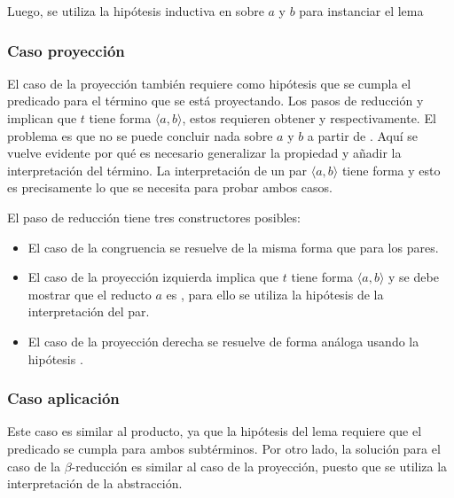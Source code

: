Luego, se utiliza la hipótesis inductiva en  sobre $a$ y $b$ para instanciar el lema


\subsubsection{Caso proyección}

El caso de la proyección también requiere como hipótesis que se cumpla el predicado para el término que se está proyectando.
Los pasos de reducción  y  implican que $t$ tiene forma $\langle a, b \rangle$, estos requieren obtener \snstar {} y \snstar {} respectivamente.
El problema es que no se puede concluir nada sobre $a$ y $b$ a partir de  .
Aquí se vuelve evidente por qué es necesario generalizar la propiedad  y añadir la interpretación del término.
La interpretación de un par $\langle a, b \rangle$ tiene forma \snstar{}  \snstar{} y esto es precisamente lo que se necesita para probar ambos casos.


El paso de reducción tiene tres constructores posibles:
\begin{itemize}
	\item El caso de la congruencia se resuelve de la misma forma que para los pares.
	\item El caso de la proyección izquierda implica que $t$ tiene forma $\langle a, b \rangle$ y se debe mostrar que el reducto $a$ es \snstar, para ello se utiliza la hipótesis  de la interpretación del par.
	\item El caso de la proyección derecha se resuelve de forma análoga usando la hipótesis .
\end{itemize}


\subsubsection{Caso aplicación}

Este caso es similar al producto, ya que la hipótesis del lema requiere que el predicado se cumpla para ambos subtérminos.
Por otro lado, la solución para el caso de la $\beta$-reducción es similar al caso de la proyección, puesto que se utiliza la interpretación de la abstracción.

